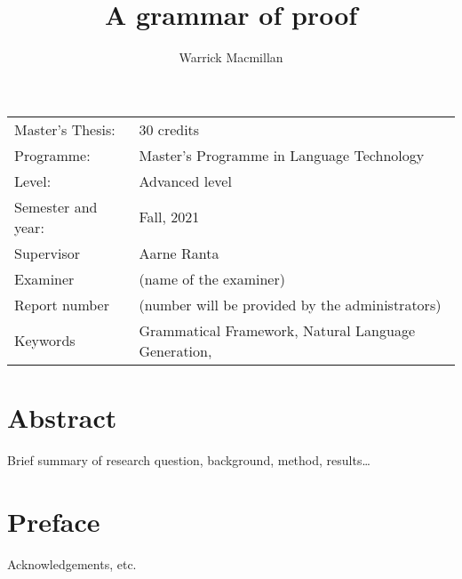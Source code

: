 \documentclass[11pt, a4paper]{article}
\title{A grammar of proof}
\author{Warrick Macmillan}
\begin{document}
\begin{titlepage}

\maketitle

\vfill

\begingroup
\renewcommand*{\arraystretch}{1.2}
\begin{tabular}{l@{\hskip 20mm}l}
\hline
Master's Thesis: & 30 credits\\
Programme: & Master’s Programme in Language Technology\\
Level: & Advanced level \\
Semester and year: & Fall, 2021\\
Supervisor & Aarne Ranta\\
Examiner & (name of the examiner)\\
Report number & (number will be provided by the administrators) \\
Keywords &  Grammatical Framework, Natural Language Generation,\\
\end{tabular}
\endgroup

\thispagestyle{empty}
\end{titlepage}

\newpage
\singlespacing
\section*{Abstract}

Brief summary of research question, background, method, results\ldots

\thispagestyle{empty}

\newpage
\section*{Preface}

Acknowledgements, etc.
\end{document}
